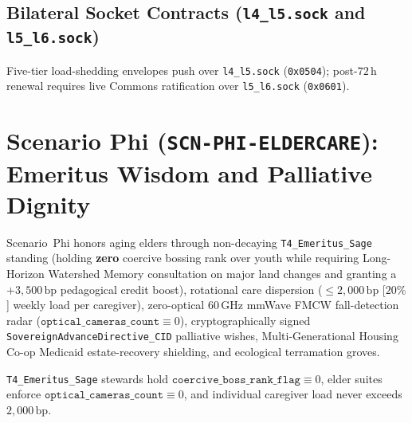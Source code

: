 \subsection{Bilateral Socket Contracts (\texttt{l4\_l5.sock} and \texttt{l5\_l6.sock})}

Five-tier load-shedding envelopes push over \texttt{l4\_l5.sock} (\texttt{0x0504}); post-$72\,\mathrm{h}$
renewal requires live Commons ratification over \texttt{l5\_l6.sock} (\texttt{0x0601}).

\section{Scenario Phi (\texttt{SCN-PHI-ELDERCARE}): Emeritus Wisdom and Palliative Dignity}
\label{sec:wavef-phi}

Scenario~Phi honors aging elders through non-decaying \texttt{T4\_Emeritus\_Sage} standing (holding
\textbf{zero} coercive bossing rank over youth while requiring Long-Horizon Watershed Memory
consultation on major land changes and granting a $+3{,}500\,\mathrm{bp}$ pedagogical credit boost),
rotational care dispersion ($\le 2{,}000\,\mathrm{bp}$ [$20\%$] weekly load per caregiver),
zero-optical $60\,\mathrm{GHz}$ mmWave FMCW fall-detection radar ($\mathtt{optical\_cameras\_count} \equiv 0$),
cryptographically signed \texttt{SovereignAdvanceDirective\_CID} palliative wishes, Multi-Generational
Housing Co-op Medicaid estate-recovery shielding, and ecological terramation groves.

\begin{invariant}
\label{inv:wavef-phi-elder}
\texttt{T4\_Emeritus\_Sage} stewards hold $\mathtt{coercive\_boss\_rank\_flag} \equiv 0$, elder
suites enforce $\mathtt{optical\_cameras\_count} \equiv 0$, and individual caregiver load never
exceeds $2{,}000\,\mathrm{bp}$.
\end{invariant}

